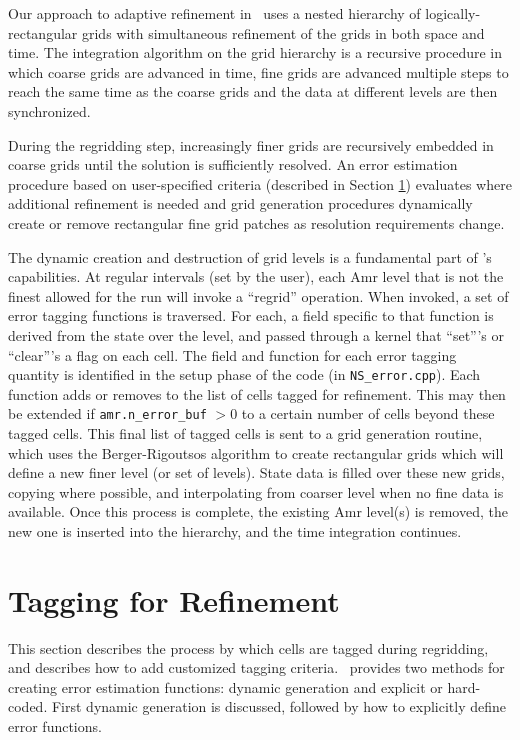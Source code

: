 \label{chap:Amr}
Our approach to adaptive refinement in \iamr\ uses a nested
hierarchy of logically-rectangular grids with simultaneous refinement
of the grids in both space and time.  The integration algorithm on the grid hierarchy
is a recursive procedure in which coarse grids are advanced in time,
fine grids are advanced multiple steps to reach the same time
as the coarse grids and the data at different levels are then synchronized.

During the regridding step, increasingly finer grids
are recursively embedded in coarse grids until the solution is
sufficiently resolved.  An error estimation procedure based on
user-specified criteria (described in Section \ref{sec:tagging}) 
evaluates where additional refinement is needed
and grid generation procedures dynamically create or
remove rectangular fine grid patches as resolution requirements change.

The dynamic creation and destruction of grid levels is a fundamental part of \iamr's capabilities.
At regular intervals (set by the user), each Amr level that is not the finest allowed for the run
will invoke a ``regrid'' operation.  When invoked, a set of error tagging functions is traversed. For each,
a field specific to that function is derived from the state over the level, and passed through a kernel
that ``set'''s or ``clear'''s a flag on each cell.
The field and function for each error tagging quantity is
identified in the setup phase of the code (in {\tt NS\_error.cpp}).
Each function adds or removes to the list of cells tagged for refinement.
This may then be extended if {\tt amr.n\_error\_buf} $> 0$ to a certain number 
of cells beyond these tagged cells. 
This final list of tagged
cells is sent to a grid generation routine, which uses the Berger-Rigoutsos algorithm to create rectangular grids
which will define a new finer level (or set of levels).  State data is filled over these new grids, copying where
possible, and interpolating from coarser level when no fine data is available.  Once this process is complete,
the existing Amr level(s) is removed, the new one is inserted into the hierarchy, and the time integration
continues.


\section{Tagging for Refinement}
\label{sec:tagging}

This section describes the process 
by which cells are tagged during regridding, and describes how to add customized tagging criteria.
\iamr\ provides two methods for creating error estimation functions: dynamic generation and explicit or
hard-coded. First dynamic generation is discussed, followed by how to explicitly define error functions.

